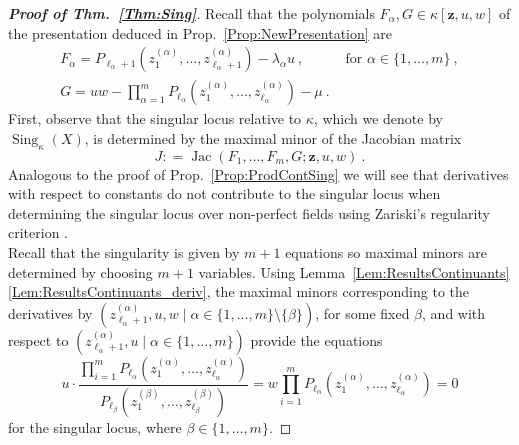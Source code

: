 \documentclass[letter,11pt]{amsart}
\DeclareMathOperator{\Sing}{Sing}
\newcommand{\z}{\boldsymbol{z}}
\newcommand{\Jac}{\operatorname{Jac}}
\theoremstyle{theorem}
\theoremstyle{definition}
\newcommand{\len}{\ell}
\numberwithin{equation}{section}
\begin{document}
\begin{proof}[\bf \em Proof of Thm.~\ref{Thm:Sing}]
	Recall that the polynomials $ F_\alpha, G \in \kappa[\z, u, w ] $ of the presentation deduced in Prop.~\ref{Prop:NewPresentation} are  
	\[
		\begin{array}{ll}
			F_\alpha  = P_{\len_\alpha +1} ( z_1^{(\alpha)}, \ldots, z_{\len_\alpha + 1}^{(\alpha)} ) 
			- \lambda_\alpha u
			\ ,
			&
			\mbox{ for } \alpha \in \{ 1, \ldots, m \} 
			\ ,
			\\[3pt]
			
			 G = \displaystyle 
			u w - 
			\prod_{\alpha=1}^m P_{\len_\alpha} (z_1^{(\alpha)}, \ldots, z_{\len_\alpha}^{(\alpha)}) - \mu
			\ .  
		\end{array} 
	\]
	First, observe that the singular locus relative to $ \kappa $,
	which we denote by $ \Sing_\kappa (X) $, 
	is determined by the maximal minor of the Jacobian matrix 
	\[ 
		J : =\Jac(F_1, \ldots, F_m, G; \z , u, w )
		\ .
	\] 	
	Analogous to the proof of Prop.~\ref{Prop:ProdContSing} we will see that derivatives with respect to constants do not contribute to the singular locus
	when determining the singular locus over non-perfect fields using Zariski's regularity criterion \cite[Theorem~11, p.~39]{Zar47}. 
	\\
	Recall that the singularity is given by $ m + 1 $ equations so maximal minors are determined by choosing $ m + 1 $ variables.
	Using Lemma~\ref{Lem:ResultsContinuants}\eqref{Lem:ResultsContinuants_deriv},
	the maximal minors corresponding to the derivatives by $ (z_{\len_\alpha+1}^{(\alpha)}, u, w  \mid \alpha \in \{1, \ldots, m \} \setminus \{\beta\}) $, for some fixed $ \beta $,
	and with respect to $ (z_{\len_\alpha+1}^{(\alpha)}, u  \mid \alpha \in \{1, \ldots, m \}) $
	provide the equations
	\begin{equation}
		\label{eq:sing_1}
		u \cdot \frac{\displaystyle \prod_{i=1}^m P_{\len_\alpha} (z_1^{(\alpha)}, \ldots, z_{\len_\alpha}^{(\alpha)})}{P_{\len_\beta} (z_1^{(\beta)}, \ldots, z_{\len_\beta}^{(\beta)})}
		=
		w \prod_{i=1}^m P_{\len_\alpha} (z_1^{(\alpha)}, \ldots, z_{\len_\alpha}^{(\alpha)})
		= 0 
	\end{equation}
	for the singular locus, where $ \beta \in \{ 1, \ldots, m \} $.
	

\end{proof}
\end{document}
